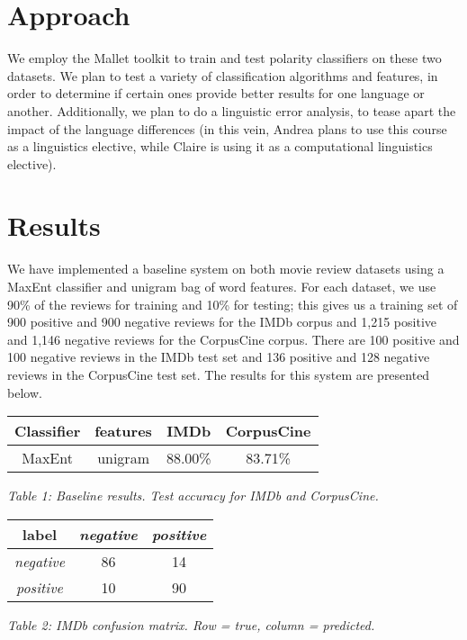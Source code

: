 \documentclass[11pt]{article}
\begin{document}
\section{Approach}

We employ the Mallet toolkit to train and test polarity classifiers on these two datasets.  We plan to test a variety of classification algorithms and features, in order to determine if certain ones provide better results for one language or another.  Additionally, we plan to do a linguistic error analysis, to tease apart the impact of the language differences (in this vein, Andrea plans to use this course as a linguistics elective, while Claire is using it as a computational linguistics elective).

\section{Results}

We have implemented a baseline system on both movie review datasets using a MaxEnt classifier and unigram bag of word features.  For each dataset, we use 90\% of the reviews for training and 10\% for testing; this gives us a training set of 900 positive and 900 negative reviews for the IMDb corpus and 1,215 positive and 1,146 negative reviews for the CorpusCine corpus.  There are 100 positive and 100 negative reviews in the IMDb test set and 136 positive and 128 negative reviews in the CorpusCine test set.  The results for this system are presented below.

\vspace{5mm}
{\centering
\begin{tabular}{|c|c|c|c|}
\hline
\textbf{Classifier} & \textbf{features} & \textbf{IMDb} & \textbf{CorpusCine} \\ \hline
MaxEnt & unigram & 88.00\% & 83.71\% \\ \hline
\end{tabular}

\vspace{1mm}
\emph{Table 1: Baseline results.  Test accuracy for IMDb and CorpusCine.}
\par}

\vspace{5mm}
{\centering
\begin{tabular}{|c|c|c|}
\hline
\textbf{label} & \emph{negative} & \emph{positive} \\ \hline
\emph{negative} & 86 & 14 \\ \hline
\emph{positive} & 10 & 90 \\ \hline
\end{tabular}

\vspace{1mm}
\emph{Table 2: IMDb confusion matrix. Row = true, column = predicted.}
\par}
\end{document}
